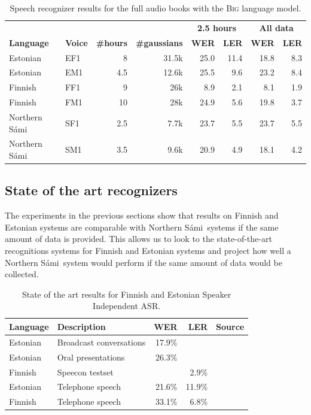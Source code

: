 \documentclass[b5paper]{article}
\newcommand{\note}[1]{{\textcolor{blue}{#1}}}
\newcommand{\ns}{Northern Sámi}
\newcommand{\ds}[1]{\textsc{#1}}
\begin{document}
\begin{table}[!ht]
\centering
\begin{tabular}{llrr|rr|rr}
& & & & \multicolumn{2}{|c}{\textbf{2.5 hours}} & \multicolumn{2}{|c}{\textbf{All data}} \\
\textbf{Language} & \textbf{Voice} & \textbf{\#hours}  &\textbf{\#gaussians} & \textbf{WER} & \textbf{LER}& \textbf{{WER}} & \textbf{LER} \\\hline %
Estonian & EF1 & 8 &31.5k & 25.0  & 11.4 & 18.8 & 8.3  \\
Estonian & EM1& 4.5& 12.6k&25.5 & 9.6  & 23.2 & 8.4  \\
Finnish & FF1 & 9 & 26k & 8.9 & 2.1  & 8.1 &  1.9  \\
Finnish & FM1 & 10 & 28k & 24.9 & 5.6  & 19.8  & 3.7    \\
\ns & SF1 & 2.5   & 7.7k & 23.7  & 5.5  & 23.7  & 5.5  \\
\ns &SM1 & 3.5 &9.6k & 20.9 & 4.9  & 18.1  & 4.2   \\
\end{tabular}
\caption{Speech recognizer results for the full audio books with the \ds{Big} language model.\label{tbl:resultbigcomp}}
\end{table}



\subsection{State of the art recognizers}
The experiments in the previous sections show that results on Finnish and Estonian systems are comparable with \ns\ systems if the same amount of data is provided. This allows us to look to the state-of-the-art recognitions systems for Finnish and Estonian systems and project how well a \ns\ system would perform if the same amount of data would be collected.

\begin{table}[!h]
\centering
\begin{tabular}{llrrl}
\textbf{Language} & \textbf{Description} & \textbf{WER} & \textbf{LER} & \textbf{Source}\\\hline
Estonian & Broadcast conversations  & 17.9\% & &  \cite{alumae2014recent} \\
Estonian & Oral presentations  & 26.3\% & & \cite{alumae2014recent} \\
Finnish & Speecon testset  & & 2.9\%&  \cite{pylkkonen2012} \\
Estonian & Telephone speech &21.6\% & 11.9\% & \cite{hirsimaki2009importance}\\
Finnish & Telephone speech & 33.1\% & 6.8\% & \cite{hirsimaki2009importance}\\
\end{tabular}
\caption{State of the art results for Finnish and Estonian Speaker Independent ASR.}\label{tbl:stateoftheart}
\end{table}
\end{document}
